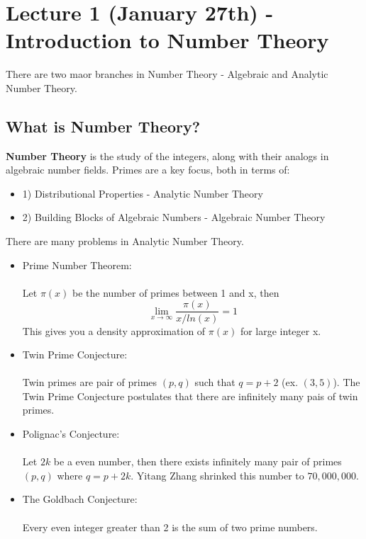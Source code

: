 \section{Lecture 1 (January 27th) - Introduction to Number Theory}

There are two maor branches in Number Theory - Algebraic and Analytic Number Theory.

\subsection{What is Number Theory?}

\begin{definition}
\textbf{Number Theory} is the study of the integers, along with their analogs in algebraic number fields. Primes are a key focus, both in terms of:
\begin{itemize}
    \item 1) Distributional Properties - Analytic Number Theory
    \item 2) Building Blocks of Algebraic Numbers - Algebraic Number Theory
\end{itemize}
\end{definition}

\begin{example}
There are many problems in Analytic Number Theory.
\begin{itemize}
    \item Prime Number Theorem:\\\\
Let $\pi(x)$ be the number of primes between 1 and x, then
\[\lim_{x \to \infty} \frac{\pi(x)}{x/ln(x)} = 1\]
This gives you a density approximation of $\pi(x)$ for large integer x.

    \item Twin Prime Conjecture:\\\\
    Twin primes are pair of primes $(p, q)$ such that $q = p+2$ (ex. $(3, 5)$). The Twin Prime Conjecture postulates that there are infinitely many pais of twin primes.
    
    \item Polignac's Conjecture:\\\\
    Let $2k$ be a even number, then there exists infinitely many pair of primes $(p, q)$ where $q = p + 2k$. Yitang Zhang shrinked this number to $70,000,000$.
    
    \item The Goldbach Conjecture:\\\\
    Every even integer greater than 2 is the sum of two prime numbers.
\end{itemize}
\end{example}

